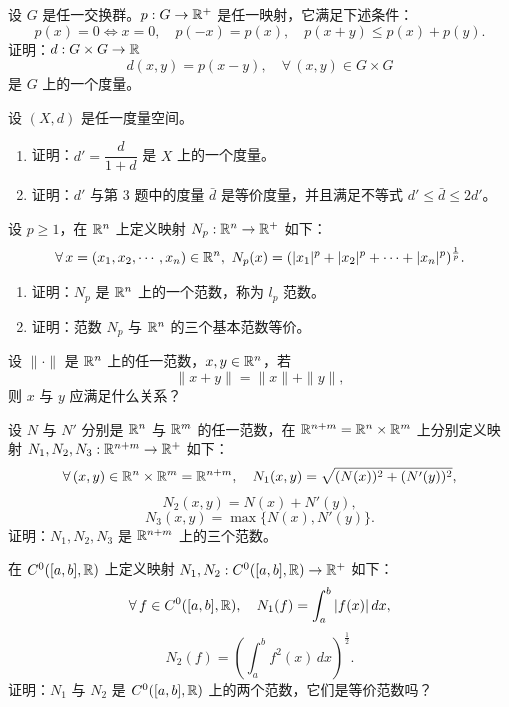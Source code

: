 \begin{exercise}
	\item 设 $G$ 是任一交换群。$p:G\to\mathbb{R}^+$ 是任一映射，它满足下述条件：
	\[p(x)=0\Longleftrightarrow x=0,\quad p(-x)=p(x),\quad p(x+y)\leqslant p(x)+p(y).\]
	证明：$d:G\times G\to\mathbb{R}$
	\[d(x,y)=p(x-y),\quad\forall\,(x,y)\in G\times G\]
	是 $G$ 上的一个度量。
\end{exercise}

\begin{exercise}
	\item 设 $(X,d)$ 是任一度量空间。
	\begin{enumerate}[label=\arabic*)]
		\item 证明：$d'=\dfrac{d}{1+d}$ 是 $X$ 上的一个度量。
		\item 证明：$d'$ 与第 3 题中的度量 $\bar d$ 是等价度量，并且满足不等式 $d'\leqslant\bar d\leqslant2d'$。
	\end{enumerate}
\end{exercise}

\begin{exercise}
	\item 设 $p\geqslant1$，在 $\mathbb{R}^n$ 上定义映射 $N_p:\mathbb{R}^n\to\mathbb{R}^+$ 如下：
	\[\forall\,x=(x_1,x_2,\cdots,x_n)\in\R^n,\ N_p(x)=(|x_1|^p+|x_2|^p+\cdots+|x_n|^p)^{\frac1p}.\]
	\begin{enumerate}[label=\arabic*)]
		\item 证明：$N_p$ 是 $\mathbb{R}^n$ 上的一个范数，称为 $l_p$ 范数。
		\item 证明：范数 $N_p$ 与 $\mathbb{R}^n$ 的三个基本范数等价。
	\end{enumerate}
\end{exercise}

\begin{exercise}
	\item 设 $\|\cdot\|$ 是 $\mathbb{R}^n$ 上的任一范数，$x,y\in\mathbb{R}^n$，若
	\[\|x+y\|=\|x\|+\|y\|,\]
	则 $x$ 与 $y$ 应满足什么关系？
\end{exercise}

\begin{exercise}
	\item 设 $N$ 与 $N'$ 分别是 $\mathbb{R}^n$ 与 $\mathbb{R}^m$ 的任一范数，在 $\mathbb{R}^{n+m}=\mathbb{R}^n\times\mathbb{R}^m$ 上分别定义映射 $N_1,N_2,N_3:\mathbb{R}^{n+m}\to\mathbb{R}^+$ 如下：
	\[\forall\,(x,y)\in\mathbb{R}^n\times\mathbb{R}^m=\mathbb{R}^{n+m},\quad N_1(x,y)=\sqrt{(N(x))^2+(N'(y))^2},\]
	\[N_2(x,y)=N(x)+N'(y),\]
	\[N_3(x,y)=\max\{N(x),N'(y)\}.\]
	证明：$N_1,N_2,N_3$ 是 $\mathbb{R}^{n+m}$ 上的三个范数。
\end{exercise}

\begin{exercise}
	\item 在 $C^0([a,b],\mathbb{R})$ 上定义映射 $N_1,N_2:C^0([a,b],\mathbb{R})\to\mathbb{R}^+$ 如下：
	\[\forall\,f\in C^0([a,b],\mathbb{R}),\quad N_1(f)=\int_a^b|f(x)|\,dx,\]
	\[N_2(f)=\left(\int_a^bf^2(x)\,dx\right)^{\frac12}.\]
	证明：$N_1$ 与 $N_2$ 是 $C^0([a,b],\mathbb{R})$ 上的两个范数，它们是等价范数吗？
\end{exercise}

